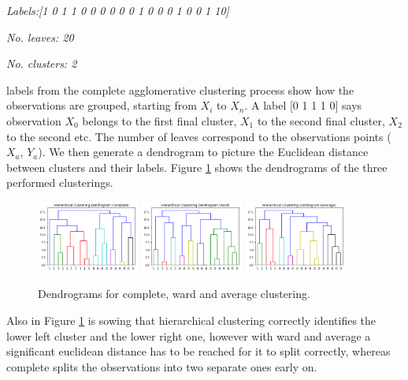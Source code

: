 \noindent\textit{Labels:[1 0 1 1 0 0 0 0 0 0 1 0 0 0 1 0 0 1 10]}

\noindent\textit{No. leaves:  20}

\noindent\textit{No. clusters:  2}


\noindent labels from the complete agglomerative clustering process show how the observations are grouped, starting from $X_i$ to $X_n$. A label [0 1 1 1 0] says observation $X_0$ belongs to the first final cluster, $X_1$ to the second final cluster, $X_2$ to the second etc. The number of leaves correspond to the observations points ($X_a$, $Y_a$). We then generate a dendrogram to picture the Euclidean distance between clusters and their labels. Figure \ref{fig:dendrogramcluster} shows the dendrograms of the three performed clusterings.

\begin{figure}[H]
	\centering
	\includegraphics[width=0.3\textwidth]{clusteringMethods/hierarchicalclustering/fig/CompleteClustering.png}
	\includegraphics[width=0.3\textwidth]{clusteringMethods/hierarchicalclustering/fig/WardClustering.png}
	\includegraphics[width=0.3\textwidth]{clusteringMethods/hierarchicalclustering/fig/AverageClustering.png}
	\caption{Dendrograms for complete, ward and average clustering.}
	\label{fig:dendrogramcluster}
\end{figure}

\noindent Also in Figure \ref{fig:dendrogramcluster} is sowing that hierarchical clustering correctly identifies the lower left cluster and the lower right one, however with ward and average a significant euclidean distance has to be reached for it to split correctly, whereas complete splits the observations into two separate ones early on. 









